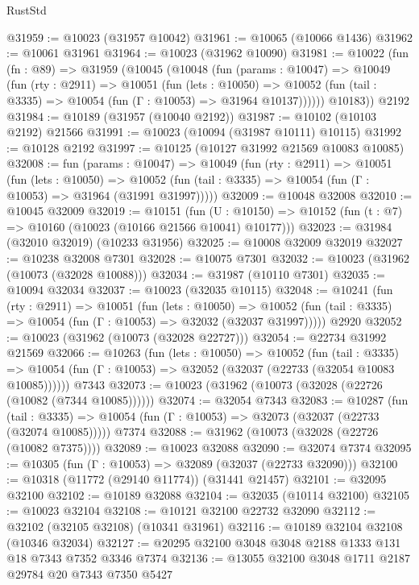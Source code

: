 \begin{lexlean}{RustStd}
\begin{coremodule}
@31959 := @10023 (@31957 @10042)
@31961 := @10065 (@10066 @1436)
@31962 := @10061 @31961
@31964 := @10023 (@31962 @10090)
@31981 := @10022
    (fun (fn : @89) =>
    @31959
      (@10045
        (@10048
          (fun (params : @10047) =>
          @10049
            (fun (rty : @2911) =>
            @10051
              (fun (lets : @10050) =>
              @10052 (fun (tail : @3335) => @10054 (fun (Γ : @10053) => @31964 @10137))))))
        @10183))
    @2192
@31984 := @10189 (@31957 (@10040 @2192))
@31987 := @10102 (@10103 @2192) @21566
@31991 := @10023 (@10094 (@31987 @10111) @10115)
@31992 := @10128 @2192
@31997 := @10125 (@10127 @31992 @21569 @10083 @10085)
@32008 := fun (params : @10047) =>
  @10049
    (fun (rty : @2911) =>
    @10051
      (fun (lets : @10050) =>
      @10052 (fun (tail : @3335) => @10054 (fun (Γ : @10053) => @31964 (@31991 @31997)))))
@32009 := @10048 @32008
@32010 := @10045 @32009
@32019 := @10151
    (fun (U : @10150) => @10152 (fun (t : @7) => @10160 (@10023 (@10166 @21566 @10041) @10177)))
@32023 := @31984 (@32010 @32019) (@10233 @31956)
@32025 := @10008 @32009 @32019
@32027 := @10238 @32008 @7301
@32028 := @10075 @7301
@32032 := @10023 (@31962 (@10073 (@32028 @10088)))
@32034 := @31987 (@10110 @7301)
@32035 := @10094 @32034
@32037 := @10023 (@32035 @10115)
@32048 := @10241
    (fun (rty : @2911) =>
    @10051
      (fun (lets : @10050) =>
      @10052 (fun (tail : @3335) => @10054 (fun (Γ : @10053) => @32032 (@32037 @31997)))))
    @2920
@32052 := @10023 (@31962 (@10073 (@32028 @22727)))
@32054 := @22734 @31992 @21569
@32066 := @10263
    (fun (lets : @10050) =>
    @10052
      (fun (tail : @3335) =>
      @10054 (fun (Γ : @10053) => @32052 (@32037 (@22733 (@32054 @10083 @10085))))))
    @7343
@32073 := @10023 (@31962 (@10073 (@32028 (@22726 (@10082 (@7344 @10085))))))
@32074 := @32054 @7343
@32083 := @10287
    (fun (tail : @3335) => @10054 (fun (Γ : @10053) => @32073 (@32037 (@22733 (@32074 @10085)))))
    @7374
@32088 := @31962 (@10073 (@32028 (@22726 (@10082 @7375))))
@32089 := @10023 @32088
@32090 := @32074 @7374
@32095 := @10305 (fun (Γ : @10053) => @32089 (@32037 (@22733 @32090)))
@32100 := @10318 (@11772 (@29140 @11774)) (@31441 @21457)
@32101 := @32095 @32100
@32102 := @10189 @32088
@32104 := @32035 (@10114 @32100)
@32105 := @10023 @32104
@32108 := @10121 @32100 @22732 @32090
@32112 := @32102 (@32105 @32108) (@10341 @31961)
@32116 := @10189 @32104 @32108 (@10346 @32034)
@32127 := @20295 @32100 @3048 @3048 @2188 @1333 @131 @18 @7343 @7352 @3346 @7374
@32136 := @13055 @32100 @3048 @1711 @2187 @29784 @20 @7343 @7350 @5427

\end{coremodule}
\end{lexlean}
